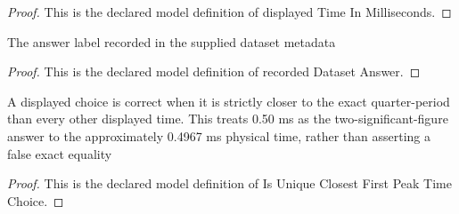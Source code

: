 \begin{proof}
  This is the declared model definition of displayed Time In Milliseconds.
\end{proof}
\begin{definition}
  \label{def:physics:phyx-mini-0934:phyxminiproblems-problemphyxmini0934-recordeddatasetanswer}
  The answer label recorded in the supplied dataset metadata
\end{definition}
\begin{proof}
  This is the declared model definition of recorded Dataset Answer.
\end{proof}
\begin{definition}
  \label{def:physics:phyx-mini-0934:phyxminiproblems-problemphyxmini0934-isuniqueclosestfirstpeaktimechoice}
  A displayed choice is correct when it is strictly closer to the exact quarter-period than every other displayed time. This treats 0.50 ms as the two-significant-figure answer to the approximately 0.4967 ms physical time, rather than asserting a false exact equality
\end{definition}
\begin{proof}
  This is the declared model definition of Is Unique Closest First Peak Time Choice.
\end{proof}
